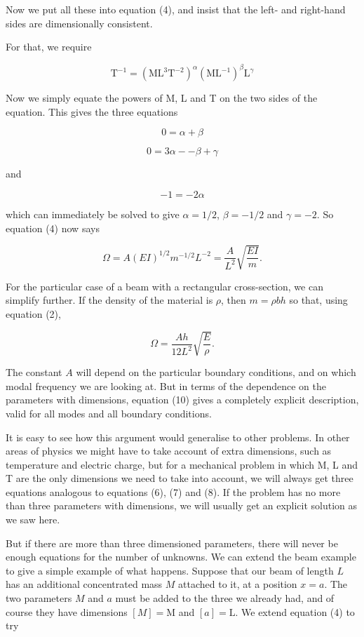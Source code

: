   Now we put all these into equation (4), and insist that the left- and 
  right-hand sides are dimensionally consistent. 

  For that, we require 

  $$\mathrm{T}^{-1} = (\mathrm{M} \mathrm{L}^3 \mathrm{T}^{-2})^\alpha 
  (\mathrm{M} \mathrm{L}^{-1})^\beta \mathrm{L}^\gamma \tag{5}$$ 

  Now we simply equate the powers of M, L and T on the two sides of the 
  equation. This gives the three equations 

  $$0=\alpha + \beta \tag{6}$$ 

  $$0 = 3 \alpha -- \beta + \gamma \tag{7}$$ 

  and 

  $$-1=-2 \alpha \tag{8}$$ 

  which can immediately be solved to give $\alpha = 1/2$, $\beta = -1/2$ and 
  $\gamma= -2$. So equation (4) now says 

  $$\Omega=A (EI)^{1/2} m^{-1/2} L^{-2} = \dfrac{A}{L^2} \sqrt{\dfrac{EI}{m}} . 
  \tag{9}$$ 

  For the particular case of a beam with a rectangular cross-section, we can 
  simplify further. If the density of the material is $\rho$, then $m=\rho b h$ 
  so that, using equation (2), 

  $$\Omega= \dfrac{Ah}{12 L^2} \sqrt{\dfrac{E}{\rho}} . \tag{10}$$ 

  The constant $A$ will depend on the particular boundary conditions, and on 
  which modal frequency we are looking at. But in terms of the dependence on 
  the parameters with dimensions, equation (10) gives a completely explicit 
  description, valid for all modes and all boundary conditions. 

  It is easy to see how this argument would generalise to other problems. In 
  other areas of physics we might have to take account of extra dimensions, 
  such as temperature and electric charge, but for a mechanical problem in 
  which M, L and T are the only dimensions we need to take into account, we 
  will always get three equations analogous to equations (6), (7) and (8). If 
  the problem has no more than three parameters with dimensions, we will 
  usually get an explicit solution as we saw here. 

  But if there are more than three dimensioned parameters, there will never be 
  enough equations for the number of unknowns. We can extend the beam example 
  to give a simple example of what happens. Suppose that our beam of length $L$ 
  has an additional concentrated mass $M$ attached to it, at a position $x=a$. 
  The two parameters $M$ and $a$ must be added to the three we already had, and 
  of course they have dimensions $[M] = \mathrm{M}$ and $[a] = \mathrm{L}$. We 
  extend equation (4) to try 

